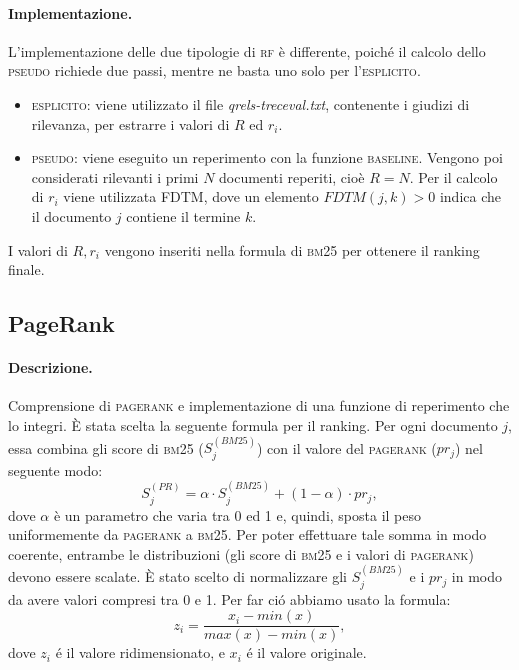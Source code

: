 \paragraph{\textbf{Implementazione.}} 
L'implementazione delle due tipologie di \textsc{rf} \`e differente, poich\'e il calcolo dello \textsc{pseudo} richiede due passi, mentre ne basta uno solo per l'\textsc{esplicito}.
\begin{itemize}
\item \textsc{esplicito}: viene utilizzato il file \textit{qrels-treceval.txt}, contenente i giudizi di rilevanza, per estrarre i valori di $R$ ed $r_i$.
\item \textsc{pseudo}: viene eseguito un reperimento con la funzione \textsc{baseline}. Vengono poi considerati rilevanti i primi $N$ documenti reperiti, cio\`e $R=N$. Per il calcolo di $r_i$ viene utilizzata FDTM, dove un elemento $FDTM(j, k)>0$ indica che il documento $j$ contiene il termine $k$.
\end{itemize}
I valori di $R, r_i$ vengono inseriti nella formula di \textsc{bm25} per ottenere il ranking finale.

\subsection{PageRank}
\label{sec:pagerank}

\paragraph{\textbf{Descrizione.}}
Comprensione di \textsc{pagerank} e implementazione di una funzione di reperimento che lo integri.
\`E stata scelta la seguente formula per il ranking. Per ogni documento $j$, essa combina gli score di \textsc{bm25} ($S^{(BM25)}_j$)  con il valore del \textsc{pagerank} ($pr_j$) nel seguente modo:
\[ S^{(PR)}_j =  \alpha \cdot S^{(BM25)}_j + (1-\alpha) \cdot pr_j,\]
dove $\alpha$ \`e un parametro che varia tra 0 ed 1 e, quindi, sposta il peso uniformemente da \textsc{pagerank} a \textsc{bm25}.
Per poter effettuare tale somma in modo coerente, entrambe le distribuzioni (gli score di \textsc{bm25} e i valori di \textsc{pagerank}) devono essere scalate. \`E stato scelto di normalizzare gli $S^{(BM25)}_j$ e i $pr_j$ in modo da avere valori compresi tra 0 e 1. Per far ci\'o abbiamo usato la formula:
\[ z_i = \frac{x_i - min(x)}{max(x) - min(x)}, \]
dove $z_i$ \'e il valore ridimensionato, e $x_i$ \'e il valore originale.

